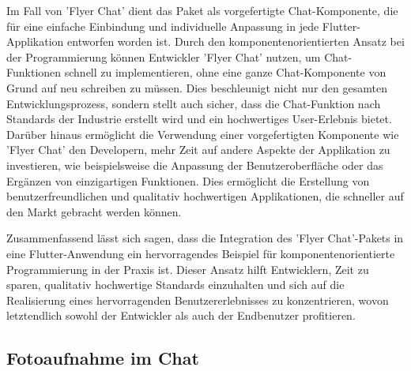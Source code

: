 Im Fall von 'Flyer Chat' dient das Paket als vorgefertigte Chat-Komponente, die für eine einfache Einbindung und individuelle Anpassung in jede Flutter-Applikation entworfen worden ist. Durch den komponentenorientierten Ansatz bei der Programmierung können Entwickler 'Flyer Chat' nutzen, um Chat-Funktionen schnell zu implementieren, ohne eine ganze Chat-Komponente von Grund auf neu schreiben zu müssen. Dies beschleunigt nicht nur den gesamten Entwicklungsprozess, sondern stellt auch sicher, dass die Chat-Funktion nach Standards der Industrie erstellt wird und ein hochwertiges User-Erlebnis bietet.
Darüber hinaus ermöglicht die Verwendung einer vorgefertigten Komponente wie 'Flyer Chat' den Developern, mehr Zeit auf andere Aspekte der Applikation zu investieren, wie beispielsweise die Anpassung der Benutzeroberfläche oder das Ergänzen von einzigartigen Funktionen. Dies ermöglicht die Erstellung von benutzerfreundlichen und qualitativ hochwertigen Applikationen, die schneller auf den Markt gebracht werden können.

Zusammenfassend lässt sich sagen, dass die Integration des 'Flyer Chat'-Pakets in eine Flutter-Anwendung ein hervorragendes Beispiel für komponentenorientierte Programmierung in der Praxis ist. Dieser Ansatz hilft Entwicklern, Zeit zu sparen, qualitativ hochwertige Standards einzuhalten und sich auf die Realisierung eines hervorragenden Benutzererlebnisses zu konzentrieren, wovon letztendlich sowohl der Entwickler als auch der Endbenutzer profitieren.

\subsection{Fotoaufnahme im Chat}

